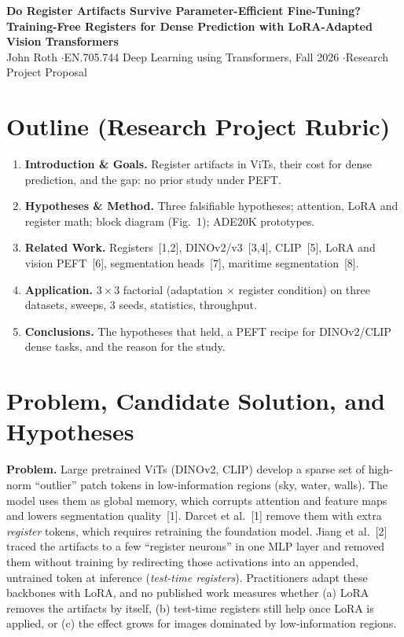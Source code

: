 \documentclass[10pt]{article}
\begin{document}
\small

\begin{center}
{\large\bfseries Do Register Artifacts Survive Parameter-Efficient Fine-Tuning?\\[1pt]
Training-Free Registers for Dense Prediction with LoRA-Adapted Vision Transformers}\\[2pt]
{\small John Roth \quad$\cdot$\quad EN.705.744 Deep Learning using Transformers, Fall 2026 \quad$\cdot$\quad Research Project Proposal}
\end{center}
\vspace{-4pt}

\section{Outline (Research Project Rubric)}
\begin{enumerate}[label=\arabic*.]
\item \textbf{Introduction \& Goals.} Register artifacts in ViTs, their cost for dense prediction, and the gap: no prior study under PEFT.
\item \textbf{Hypotheses \& Method.} Three falsifiable hypotheses; attention, LoRA and register math; block diagram (Fig.~1); ADE20K prototypes.
\item \textbf{Related Work.} Registers~[1,2], DINOv2/v3~[3,4], CLIP~[5], LoRA and vision PEFT~[6], segmentation heads~[7], maritime segmentation~[8].
\item \textbf{Application.} $3\times3$ factorial (adaptation $\times$ register condition) on three datasets, sweeps, 3 seeds, statistics, throughput.
\item \textbf{Conclusions.} The hypotheses that held, a PEFT recipe for DINOv2/CLIP dense tasks, and the reason for the study.
\end{enumerate}

\section{Problem, Candidate Solution, and Hypotheses}
\textbf{Problem.} Large pretrained ViTs (DINOv2, CLIP) develop a sparse set of high-norm ``outlier'' patch tokens in low-information regions (sky, water, walls). The model uses them as global memory, which corrupts attention and feature maps and lowers segmentation quality~[1]. Darcet et al.~[1] remove them with extra \emph{register} tokens, which requires retraining the foundation model. Jiang et al.~[2] traced the artifacts to a few ``register neurons'' in one MLP layer and removed them without training by redirecting those activations into an appended, untrained token at inference (\emph{test-time registers}). Practitioners adapt these backbones with LoRA, and no published work measures whether (a) LoRA removes the artifacts by itself, (b) test-time registers still help once LoRA is applied, or (c) the effect grows for images dominated by low-information regions.
\end{document}
